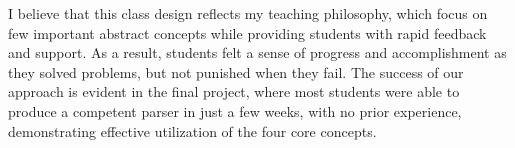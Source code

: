 \documentclass[11pt,a4paper,sans]{moderncv} %
\begin{document}
I believe that this class design reflects my teaching philosophy, which focus on few important abstract concepts while providing students with rapid feedback and support. 
As a result, students felt a sense of progress and accomplishment as they solved problems, but not punished when they fail. 
The success of our approach is evident in the final project, where most students were able to produce a competent parser in just a few weeks, with no prior experience, demonstrating effective utilization of the four core concepts.

\newpage
\printbibliography %
\end{document}
